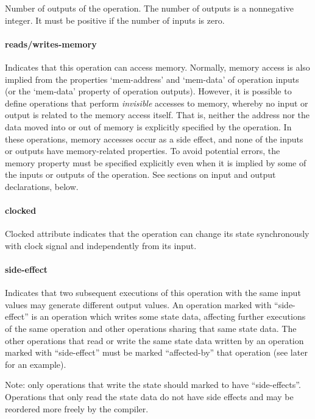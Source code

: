 \documentclass[twoside]{tceusermanual}
\begin{document}
Number of outputs of the operation. The number of outputs is a
nonnegative integer. It must be positive if the number of inputs is
zero.

\paragraph{reads/writes-memory}

Indicates that this operation can access memory.  Normally, memory access is
also implied from the properties `mem-address' and `mem-data' of operation
inputs (or the `mem-data' property of operation outputs).  However, it is
possible to define operations that perform \emph{invisible} accesses to
memory, whereby no input or output is related to the memory access itself.
That is, neither the address nor the data moved into or out of memory is
explicitly specified by the operation.  In these operations, memory accesses
occur as a side effect, and none of the inputs or outputs have
memory-related properties.  To avoid potential errors, the memory property
must be specified explicitly even when it is implied by some of the inputs
or outputs of the operation.  See sections on input and output declarations,
below.

\paragraph{clocked}
Clocked attribute indicates that the operation can change its state
synchronously with clock signal and independently from its input.

\paragraph{side-effect}

Indicates that two subsequent executions of this operation with the same
input values may generate different output values.  An operation marked with
``side-effect'' is an operation which writes some state data, affecting
further executions of the same operation and other operations sharing
that same state data. The other operations that read or write
the same state data written by an operation marked with ``side-effect'' 
must be marked ``affected-by'' that operation (see later for an example).

Note: only operations that write the state should marked to
have ``side-effects''. Operations that only read the state data do not
have side effects and may be reordered more freely by the compiler.
\end{document}
